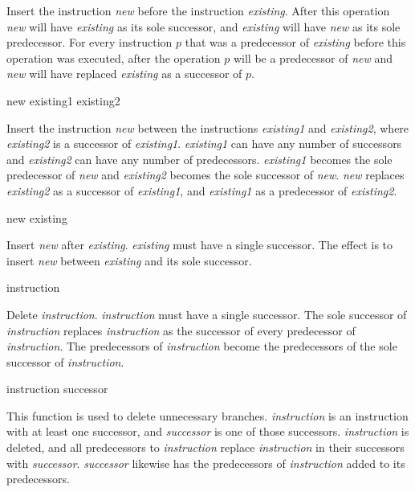Insert the instruction \textit{new} before the instruction
\textit{existing}.  After this operation \textit{new} will have
\textit{existing} as its sole successor, and \textit{existing} will
have \textit{new} as its sole predecessor.  For every instruction $p$
that was a predecessor of \textit{existing} before this operation was
executed, after the operation $p$ will be a predecessor of
\textit{new} and \textit{new} will have replaced \textit{existing} as
a successor of $p$.

 {new existing1 existing2}

Insert the instruction \textit{new} between the instructions
\textit{existing1} and \textit{existing2}, where \textit{existing2} is
a successor of \textit{existing1}.  \textit{existing1} can have any
number of successors and \textit{existing2} can have any number of
predecessors.  \textit{existing1} becomes the sole predecessor of
\textit{new} and \textit{existing2} becomes the sole successor of
\textit{new}.  \textit{new} replaces \textit{existing2} as a successor
of \textit{existing1}, and \textit{existing1} as a predecessor of
\textit{existing2}.

 {new existing}

Insert \textit{new} after \textit{existing}.  \textit{existing} must
have a single successor.  The effect is to insert \textit{new} between
\textit{existing} and its sole successor.

 {instruction}

Delete \textit{instruction}.  \textit{instruction} must have a single
successor.  The sole successor of \textit{instruction} replaces
\textit{instruction} as the successor of every predecessor of
\textit{instruction}.  The predecessors of \textit{instruction} become
the predecessors of the sole successor of \textit{instruction}.

 {instruction successor}

This function is used to delete unnecessary branches.
\textit{instruction} is an instruction with at least one successor,
and \textit{successor} is one of those successors. \textit{instruction}
is deleted, and all predecessors to \textit{instruction} replace
\textit{instruction} in their successors with \textit{successor}.
\textit{successor} likewise has the predecessors of \textit{instruction}
added to its predecessors.

